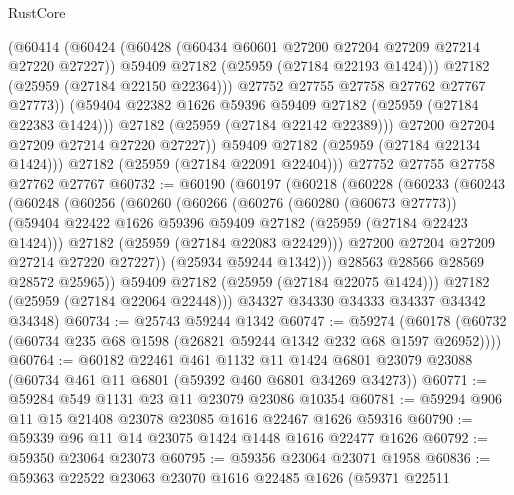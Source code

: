 \begin{lexlean}{RustCore}
\begin{coremodule}
                  (@60414
                    (@60424
                      (@60428 (@60434 @60601 @27200 @27204 @27209 @27214 @27220 @27227))
                      @59409
                      @27182
                      (@25959 (@27184 @22193 @1424)))
                    @27182
                    (@25959 (@27184 @22150 @22364)))
                  @27752
                  @27755
                  @27758
                  @27762
                  @27767
                  @27773))
              (@59404 @22382 @1626 @59396 @59409 @27182 (@25959 (@27184 @22383 @1424)))
              @27182
              (@25959 (@27184 @22142 @22389)))
            @27200
            @27204
            @27209
            @27214
            @27220
            @27227))
        @59409
        @27182
        (@25959 (@27184 @22134 @1424)))
      @27182
      (@25959 (@27184 @22091 @22404)))
    @27752
    @27755
    @27758
    @27762
    @27767
@60732 := @60190
    (@60197
      (@60218
        (@60228
          (@60233
            (@60243
              (@60248
                (@60256
                  (@60260
                    (@60266
                      (@60276
                        (@60280 (@60673 @27773))
                        (@59404 @22422 @1626 @59396 @59409 @27182 (@25959 (@27184 @22423 @1424)))
                        @27182
                        (@25959 (@27184 @22083 @22429)))
                      @27200
                      @27204
                      @27209
                      @27214
                      @27220
                      @27227))
                  (@25934 @59244 @1342)))
              @28563
              @28566
              @28569
              @28572
              @25965))
          @59409
          @27182
          (@25959 (@27184 @22075 @1424)))
        @27182
        (@25959 (@27184 @22064 @22448)))
      @34327
      @34330
      @34333
      @34337
      @34342
      @34348)
@60734 := @25743 @59244 @1342
@60747 := @59274
    (@60178 (@60732 (@60734 @235 @68 @1598 (@26821 @59244 @1342 @232 @68 @1597 @26952))))
@60764 := @60182
    @22461
    @461
    @1132
    @11
    @1424
    @6801
    @23079
    @23088
    (@60734 @461 @11 @6801 (@59392 @460 @6801 @34269 @34273))
@60771 := @59284 @549 @1131 @23 @11 @23079 @23086 @10354
@60781 := @59294 @906 @11 @15 @21408 @23078 @23085 @1616 @22467 @1626 @59316
@60790 := @59339 @96 @11 @14 @23075 @1424 @1448 @1616 @22477 @1626
@60792 := @59350 @23064 @23073
@60795 := @59356 @23064 @23071 @1958
@60836 := @59363
    @22522
    @23063
    @23070
    @1616
    @22485
    @1626
    (@59371
      @22511

\end{coremodule}
\end{lexlean}
